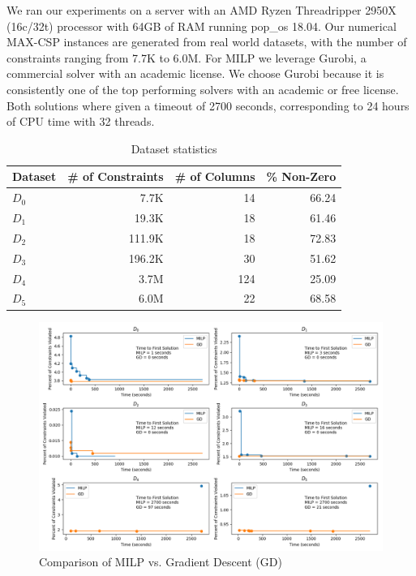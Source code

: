 \documentclass[a4paper]{article}
\begin{document}
We ran our experiments on a server with an AMD Ryzen Threadripper 2950X
(16c/32t) processor with 64GB of RAM running pop\_os 18.04. Our numerical MAX-CSP
instances are generated from real world datasets, with the number of
constraints ranging from 7.7K to 6.0M.  For MILP we leverage Gurobi, a
commercial solver with an academic license. We choose Gurobi because it is
consistently one of the top performing solvers \cite{benchmark} with an
academic or free license. Both solutions where given a timeout of 2700 seconds,
corresponding to 24 hours of CPU time with 32 threads.
\begin{table}[ht!]
	\centering
\caption{Dataset statistics}
\begin{tabular}{|l|r|r|r|}
\toprule
Dataset &  \# of Constraints &  \# of Columns &  \% Non-Zero \\
\midrule
         $D_0$ &                   7.7K &                 14 &         66.24 \\
		 \hline
         $D_1$ &                  19.3K &                 18 &         61.46 \\
		 \hline
         $D_2$ &                 111.9K &                 18 &         72.83 \\
		 \hline
         $D_3$ &                 196.2K &                 30 &         51.62 \\
		 \hline
         $D_4$ &                3.7M    &                124 &         25.09 \\
		 \hline
         $D_5$ &                6.0M    &                 22 &         68.58 \\
\bottomrule
\end{tabular}
\end{table}

\begin{figure}[ht!]
	\caption{Comparison of MILP vs. Gradient Descent (GD)}
	\includegraphics[width=\textwidth]{./time_series.png}
\end{figure}
\end{document}
